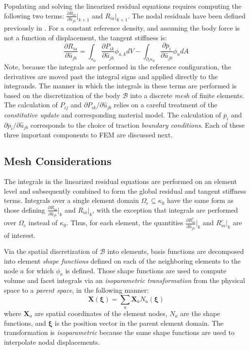 Populating and solving the linearized residual equations requires computing the following two terms: $\frac{\partial R_{ia}}{\partial \hat{u}_{jb}} \big|_{k+1}$ and $R_{ia}\big|_{k+1}$. The nodal residuals have been defined previously in . For a constant reference density, and assuming the body force is not a function of displacement, the tangent stiffness is:
\begin{equation}
\frac{\partial R_{ia}}{\partial \hat{u}_{jb}} = \int_{\kappa_0}\frac{\partial P_{ik}}{\partial \hat{u}_{jb}}\phi_{a,k}dV - \int_{\partial_t\kappa_0}\frac{\partial \overline{p}_i}{\partial \hat{u}_{jb}}\phi_adA
\end{equation}
Note, because the integrals are performed in the reference configuration, the derivatives are moved past the integral signs and applied directly to the integrands. The manner in which the integrals in these terms are performed is based on the discretization of the body $\mathcal{B}$ into a discrete \textit{mesh} of finite elements. The calculation of $P_{ij}$ and $\partial{P}_{ik}/\partial{\hat{u}_{jb}}$ relies on a careful treatment of the \textit{constitutive update} and corresponding material model. The calculation of $\overline{p}_i$ and $\partial{\overline{p}_i}/\partial{\hat{u}_{jb}}$ corresponds to the choice of traction \textit{boundary conditions}. Each of these three important components to FEM are discussed next.

\subsection{Mesh Considerations}

The integrals in the linearized residual equations are performed on an element level and subsequently combined to form the global residual and tangent stiffness terms. Integrals over a single element domain $\Omega_e \subseteq \kappa_0$ have the same form as those defining $\frac{\partial R_{ia}}{\partial \hat{u}_{jb}} \big|_k$ and $R_{ia}\big|_k$, with the exception that integrals are performed over $\Omega_e$ instead of $\kappa_0$. Thus, for each element, the quantities $\frac{\partial R^e_{ia}}{\partial \hat{u}_{jb}} \big|_k$ and $R^e_{ia}\big|_k$ are of interest.

Via the spatial discretization of $\mathcal{B}$ into elements, basis functions are decomposed into element \textit{shape functions} defined on each of the neighboring elements to the node $a$ for which $\phi_a$ is defined. Those shape functions are used to compute volume and facet integrals via an \textit{isoparametric transformation} from the physical space to a \textit{parent space}, in the following manner:
\begin{equation}
\bm{X}(\bm{\xi}) = \sum\limits_{a}\bm{X}_a{N}_a(\bm{\xi})
\end{equation}
where $\bm{X}_a$ are spatial coordinates of the element nodes, $N_a$ are the shape functions, and $\bm{\xi}$ is the position vector in the parent element domain. The transformation is \textit{isoparametric} because the same shape functions are used to interpolate nodal displacements.


